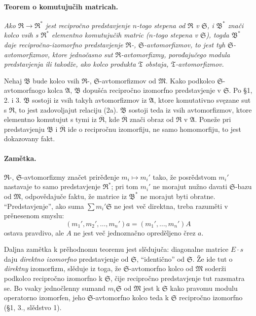 \documentclass[11pt]{article}
\providecommand{\frB}{\mathfrak B}
\providecommand{\frM}{\mathfrak M}
\providecommand{\frR}{\mathfrak R}
\providecommand{\frS}{\mathfrak S}
\providecommand{\frT}{\mathfrak T}
\providecommand{\mA}{\mathfrak A}
\begin{document}
\paragraph{Teorem o komutujučih matricah.}
\emph{Ako \(\frR\to\frR^*\) jest recipročno predstavjenje \(n\)-togo stepena od \(\frR\) v \(\frS\), i \(\frB^*\) znači kolco vsih s \(\frR^*\) elementno komutujučih matric (\(n\)-togo stepena v \(\frS\)), togda \(\frB^*\) daje recipročno-izomorfno predstavjenje \(\frR\)-, \(\frS\)-avtomorfizmov, to jest tyh \(\frS\)-avtomorfizmov, ktore jednočasno sut \(\frR\)-avtomorfizmy, porođajučego modula predstavjenja ili takodže, ako kolco produkta \(\frT\) obstaja, \(\frT\)-avtomorfizmov.}

Nehaj \(\frB\) bude kolco vsih \(\frR\)-, \(\frS\)-avtomorfizmov od \(\frM\). Kako podkolco \(\frS\)-avtomorfnogo kolca \(\mA\), \(\frB\) dopušća recipročno izomorfno predstavjenje v \(\frS\). Po §1, 2. i 3. \(\frB\) sostoji iz vsih takyh avtomorfizmov iz \(\mA\), ktore komutativno svęzane sut s \(\frR\), to jest zadovoljajut relaciju (2a). \(\frB\) sostoji teda iz vsih avtomorfizmov, ktore elementno komutujut s tymi iz \(\overline{\frR}\), kde \(\overline{\frR}\) znači obraz od \(\frR\) v \(\mA\). Poneže pri predstavjenju \(\frB\) i \(\overline{\frR}\) ide o recipročnu izomorfiju, ne samo homomorfiju, to jest dokazovany fakt.

\paragraph{Zamětka.}
\(\frR\)-, \(\frS\)-avtomorfizmy značet prirěđenje \(m_i\mapsto m_i'\) tako, že posrědstvom \(m_i'\) nastavaje to samo predstavjenje \(\frR^*\); pri tom \(m_i'\) ne morajut nužno davati \(\frS\)-bazu od \(\frM\), odpovědajuče faktu, že matrice iz \(\frB^*\) ne morajut byti obratne. ``Predstavjenje'', ako suma \(\sum m_i'\frS\) ne jest več direktna, treba razuměti v prěnesenom smyslu:
\[
        (m_1',m_2',\ldots,m_n')a=(m_1',\ldots,m_n')A
\]
ostava pravdivo, ale \(A\) ne jest več jednoznačno opreděljeno črez \(a\).

Daljna zamětka k prěhodnomu teoremu jest slědujuča: diagonalne matrice \(E\cdot s\) daju \emph{direktno izomorfno} predstavjenje od \(\frS\), ``identično'' od \(\frS\). Že ide tut o \emph{direktny} izomorfizm, slěduje iz toga, že \(\frS\)-avtomorfno kolco od \(\frM\) soderži podkolco recipročno izomorfno k \(\frS\), čije recipročno predstavjenje tut razsmatra se. Bo vsaky jednočlenny sumand \(m_i\frS\) od \(\frM\) jest k \(\frS\) kako pravomu modulu operatorno izomorfen, jeho \(\frS\)-avtomorfno kolco teda k \(\frS\) recipročno izomorfno (§1, 3., slědstvo 1).
\end{document}
